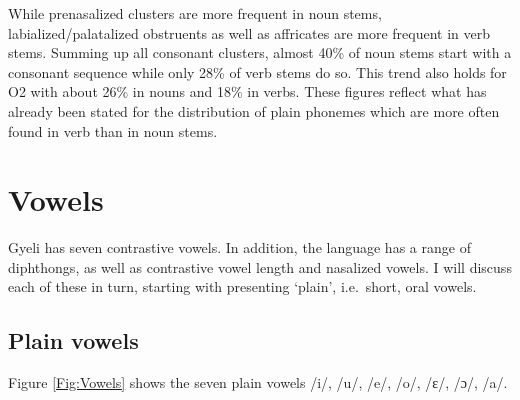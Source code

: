 While prenasalized clusters are more frequent in noun stems, labialized/palatalized obstruents as well as affricates are more frequent in verb stems. Summing up all consonant clusters, almost 40\% of noun stems start with a consonant sequence while only 28\% of verb stems do so. This trend also holds for O2 with about 26\% in nouns and 18\% in verbs. These figures reflect what has already been stated for the distribution of plain phonemes which are more often found in verb than in noun stems. 





\section{Vowels}
\label{sec:Vowels}

Gyeli has seven contrastive vowels. In addition, the language has a range of diphthongs, as well as contrastive vowel length and nasalized vowels. I will discuss each of these in turn, starting with presenting `plain', i.e.\ short, oral vowels.

\subsection{Plain vowels}
\label{sec:CardVowels}

 Figure \ref{Fig:Vowels} shows the seven plain vowels /i/, /u/, /e/, /o/, /ɛ/, /ɔ/, /a/.

